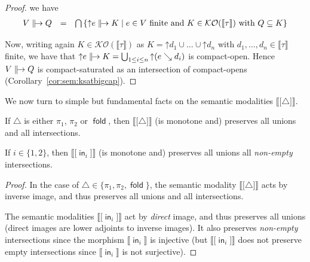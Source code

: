 \documentclass[%
  a4paper,
  UKenglish,
  cleveref,
  autoref,
  thm-restate,
  numberwithinsect,
]{lipics-v2021}
\newcommand\sle\subseteq
\newcommand\up{\mathord{\uparrow}}
\newcommand\I[1]{\llbracket #1 \rrbracket} %
\newcommand\Open{\mathcal{O}}		%
\newcommand\K{\mathcal{K}}		%
\newcommand\term[1]{\mathsf{#1}}
\newcommand\inj{\mathop{\term{in}}}
\newcommand\fold{\mathop{\term{fold}}}
\newcommand\defrealto{\mathrel\parallel\joinrel\to}
\newcommand\realto{\mathrel{\defrealto}}
\newcommand\PT{\tau}		%
\newcommand\step{\searrow}
\newcommand\form[1]{\lbrack #1 \rbrack}
\newcommand\modgen{\mathord{\triangle}}	%
\begin{document}
\begin{proof}
\noindent
we have
\[
\begin{array}{l l l}
  V \realto Q
& =
& \bigcap
  \left\{
  \up e \realto K
  \mid
  \text{$e \in V$ finite and $K \in \K\Open(\I\PT)$ with $Q \sle K$}
  \right\}
\end{array}
\]

Now, writing again $K \in \K\Open(\I\PT)$
as $K = \up d_1 \cup \dots \cup \up d_n$
with $d_1,\dots,d_n \in \I\PT$ finite,
we have that $\up e \realto K = \bigcup_{1 \leq i \leq n}\up(e \step d_i)$
is compact-open.
Hence $V \realto Q$ is compact-saturated as an intersection of compact-opens
(Corollary~\ref{cor:sem:ksatbigcap}).
\end{proof}


We now turn to simple but fundamental facts
on the semantic modalities $\I{\form{\modgen}}$.

\begin{lemma}
\label{lem:proof:sem:log:mod}
If $\modgen$ is either $\pi_1$, $\pi_2$ or $\fold$,
then $\I{\form{\modgen}}$ (is monotone and) preserves all unions and all intersections.

If $i \in\{1,2\}$, then $\I{\form{\inj_i}}$
(is monotone and) preserves all unions all \emph{non-empty} intersections.
\end{lemma}

\begin{proof}
In the case of $\modgen \in \{\pi_1, \pi_2, \fold\}$,
the semantic modality $\I{\form{\modgen}}$ acts by inverse image,
and thus preserves all unions and all intersections.

The semantic modalities $\I{\form{\inj_i}}$ act by \emph{direct} image,
and thus preserves all unions
(direct images are lower adjoints to inverse images).
It also preserves \emph{non-empty} intersections since 
the morphism $\I{\inj_i}$ is injective
(but $\I{\form{\inj_i}}$ 
does not preserve empty intersections since $\I{\inj_i}$
is not surjective).
\end{proof}
\end{document}
